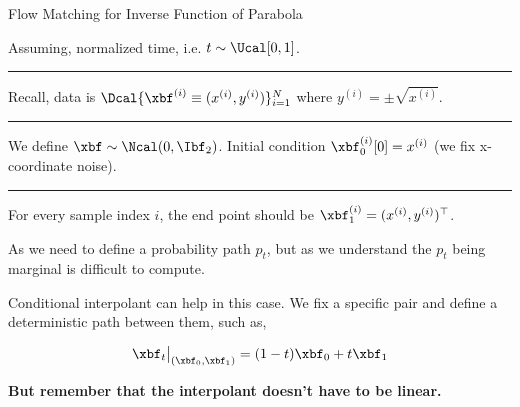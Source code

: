 \documentclass[aspectratio=169,xcolor=dvipsnames,svgnames,x11names,fleqn]{beamer}
\begin{document}
\begin{frame}{Flow  Matching for Inverse Function of Parabola}

Assuming, normalized time, i.e. $t \sim \Ucal[0, 1]$.

{\vspace{3pt}\color{peachFuzz}\hrule\vspace{3pt}}

Recall, data is $ \Dcal \{\xbf^{(i)} \equiv (x^{(i)}, y^{(i)})\}_{i=1}^N $ where $y^{(i)} = \pm\sqrt{x^{(i)}}$.

{\vspace{3pt}\color{peachFuzz}\hrule\vspace{3pt}}

We define  $\xbf \sim \Ncal(0, \Ibf_2)$. Initial condition $\xbf^{(i)}_0[0] = x^{(i)}$ (we fix x-coordinate noise).

{\vspace{3pt}\color{peachFuzz}\hrule\vspace{3pt}}

For every sample index $i$, the end point should be $\xbf^{(i)}_1 = (x^{(i)}, y^{(i)})^\top$.


{\vspace{3pt}\color{peachFuzz}\classicRule\vspace{3pt}}


As we need to define a probability path $p_t$, but as we understand the $p_t$ being marginal is difficult to compute.

\vspace{5pt}
Conditional interpolant can help in this case. We fix a specific pair and define a deterministic path between them, such as,

\begin{align*}
\xbf_t \big|_{(\xbf_0, \xbf_1)} = (1 - t)\xbf_0  + t \xbf_1
\end{align*}

\vspace{10pt}

\textbf{But remember that the interpolant doesn't have to be linear.}
\end{frame}
\end{document}
